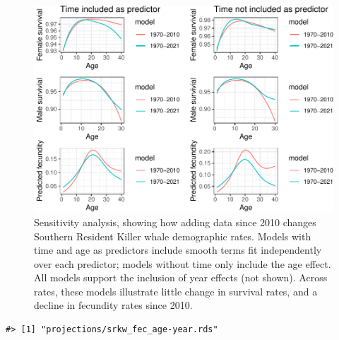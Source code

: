 \documentclass[]{article}
\begin{document}
\begin{figure}
\centering
\includegraphics{status_update_files/figure-latex/unnamed-chunk-7-1.pdf}
\caption{Sensitivity analysis, showing how adding data since 2010
changes Southern Resident Killer whale demographic rates. Models with
time and age as predictors include smooth terms fit independently over
each predictor; models without time only include the age effect. All
models support the inclusion of year effects (not shown). Across rates,
these models illustrate little change in survival rates, and a decline
in fecundity rates since 2010. \label{fig:demo-rates}}
\end{figure}

\begin{verbatim}
#> [1] "projections/srkw_fec_age-year.rds"
\end{verbatim}
\end{document}
